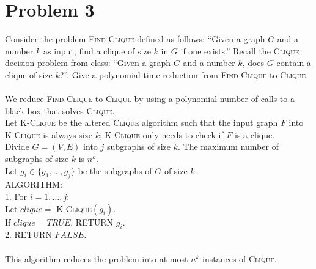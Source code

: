 \documentclass[10pt,letterpaper]{article}
\newcommand\tab[1][0.5cm]{\hspace*{#1}}
\begin{document}
\section{Problem 3}
Consider the problem \textsc{Find-Clique} defined as follows: ``Given a graph $G$ and a number $k$ as input, find a clique of size $k$ in $G$ if one exists.'' Recall the \textsc{Clique} decision problem from class: ``Given a graph $G$ and a number $k$, does $G$ contain a clique of size $k$?''. Give a polynomial-time reduction from \textsc{Find-Clique} to \textsc{Clique}.\\\\
We reduce \textsc{Find-Clique} to \textsc{Clique} by using a polynomial number of calls to a black-box that solves \textsc{Clique}.\\
Let \textsc{K-Clique} be the altered \textsc{Clique} algorithm such that the input graph $F$ into \textsc{K-Clique} is always size $k$; \textsc{K-Clique} only needs to check if $F$ is a clique.\\
Divide $G=(V,E)$ into $j$ subgraphs of size $k$. The maximum number of subgraphs of size $k$ is $n^k$.\\
Let $g_i \in \{g_1,\dots,g_j\}$ be the subgraphs of $G$ of size $k$.\\
\textsc{ALGORITHM}:\\
1. For $i=1,\dots,j$:\\
\tab Let $clique = $ \textsc{K-Clique}$(g_i)$.\\
\tab If $clique = TRUE$, \textsc{RETURN} $g_i$.\\
2. \textsc{RETURN} $FALSE$.\\\\
This algorithm reduces the problem into at most $n^k$ instances of \textsc{Clique}.\\

\pagebreak

\end{document}
